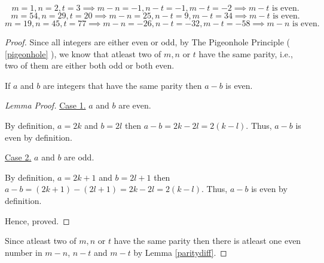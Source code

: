 \begin{scratch}
	$$m = 1, n = 2, t = 3 \implies m-n = -1, n-t = -1, m-t = -2 \implies m-t \text { is even.}$$
	$$m = 54, n = 29, t = 20 \implies m-n = 25, n-t = 9, m-t = 34 \implies m-t \text { is even.}$$
	$$m = 19, n = 45, t = 77 \implies m-n = -26, n-t = -32, m-t = -58 \implies m-n \text { is even.}$$
\end{scratch}

\begin{proof}
	Since all integers are either even or odd, by The Pigeonhole Principle ( \ref{pigeonhole} ), we know that atleast two of $m, n$ or $t$ have the same parity, i.e., two of them are either both odd or both even.

	\begin{lemma} \label{paritydiff}
		If $a$ and $b$ are integers that have the same parity then $a-b$ is even.
	\end{lemma}
	\begin{proof}[Lemma Proof]
		\underline{Case 1.} $a$ and $b$ are even.

		By definition, $a = 2k$ and $b = 2l$ then $a-b = 2k-2l = 2(k-l)$. Thus, $a-b$ is even by definition.

		\underline{Case 2.} $a$ and $b$ are odd.

		By definition, $a = 2k+1$ and $b = 2l+1$ then $a-b = (2k+1)-(2l+1) = 2k-2l = 2(k-l)$. Thus, $a-b$ is even by definition.

		Hence, proved.
	\end{proof}

	Since atleast two of $m, n$ or $t$ have the same parity then there is atleast one even number in $m-n$, $n-t$ and $m-t$ by Lemma \ref{paritydiff}.
\end{proof}


